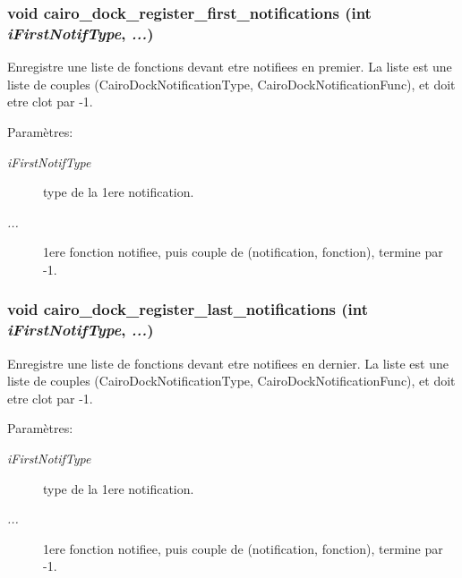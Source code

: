 \subsubsection{\setlength{\rightskip}{0pt plus 5cm}void cairo\_\-dock\_\-register\_\-first\_\-notifications (int {\em iFirstNotifType},  {\em ...})}\label{cairo-dock-notifications_8h_2f070bd652229d8ffef801ec27d64777}


Enregistre une liste de fonctions devant etre notifiees en premier. La liste est une liste de couples (CairoDockNotificationType, CairoDockNotificationFunc), et doit etre clot par -1. \begin{Desc}
\item[Paramètres:]
\begin{description}
\item[{\em iFirstNotifType}]type de la 1ere notification. \item[{\em ...}]1ere fonction notifiee, puis couple de (notification, fonction), termine par -1. \end{description}
\end{Desc}
\subsubsection{\setlength{\rightskip}{0pt plus 5cm}void cairo\_\-dock\_\-register\_\-last\_\-notifications (int {\em iFirstNotifType},  {\em ...})}\label{cairo-dock-notifications_8h_43af2cd20c3f208f40c025efae51cda6}


Enregistre une liste de fonctions devant etre notifiees en dernier. La liste est une liste de couples (CairoDockNotificationType, CairoDockNotificationFunc), et doit etre clot par -1. \begin{Desc}
\item[Paramètres:]
\begin{description}
\item[{\em iFirstNotifType}]type de la 1ere notification. \item[{\em ...}]1ere fonction notifiee, puis couple de (notification, fonction), termine par -1. \end{description}
\end{Desc}
